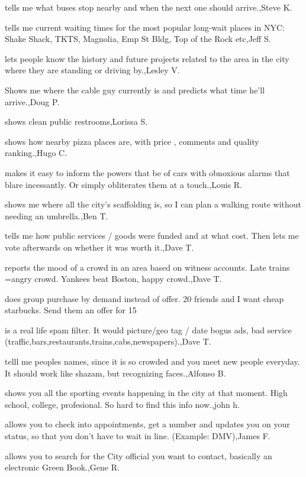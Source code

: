 \documentclass{article}
\begin{document}
tells me what buses stop nearby and when the next one should arrive.,Steve K.

tells me current waiting times for the most popular long-wait places in NYC: Shake Shack, TKTS, Magnolia,  Emp St Bldg, Top of the Rock etc,Jeff S.

lets people know the history and future projects related to the area in the city where they are standing or driving by.,Lesley V.

Shows me where the cable guy currently is and predicts what time he'll arrive.,Doug P.

shows clean public restrooms,Lorissa S.

shows how nearby pizza places are, with price , comments and quality ranking.,Hugo C.

makes it easy to inform the powers that be of cars with obnoxious alarms that blare incessantly. Or simply obliterates them at a touch.,Louis R.

shows me where all the city's scaffolding is, so I can plan a walking route without needing an umbrella.,Ben T.

tells me how public services / goods were funded and at what cost. Then lets me vote afterwards on whether it was worth it.,Dave T.

reports the mood of a crowd in an area based on witness accounts. Late trains =angry crowd. Yankees beat Boston, happy crowd.,Dave T.

does group purchase by demand instead of offer. 20 friends and I want cheap starbucks. Send them an offer for 15%

is a real life spam filter. It would picture/geo tag / date bogus ads, bad service (traffic,bars,restaurants,trains,cabs,newspapers).,Dave T.

telll me peoples names, since  it is so crowded and you meet new people everyday. It should work like  shazam, but recognizing faces.,Alfonso B.

shows you all the sporting events happening in the city at that moment.  High school, college, profesional. So hard to find this info now.,john h.

allows you to check into appointments, get a number and updates you on your status, so that you don't have to wait in line. (Example: DMV),James F.

allows you to search for the City official you want to contact, basically an electronic Green Book.,Gene R.
\end{document}
